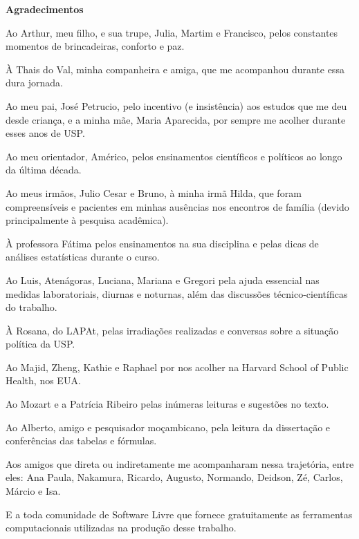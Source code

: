 \newpage

\begin{center}
  \textbf{Agradecimentos} 
\end{center}

Ao Arthur, meu filho, e sua trupe, Julia, Martim e Francisco, pelos 
constantes momentos de brincadeiras, conforto e paz.

À Thais do Val, minha companheira e amiga, que me acompanhou durante  
essa dura jornada.  

Ao meu pai, José Petrucio, pelo incentivo (e insistência) aos estudos que me deu desde criança, e a minha mãe, Maria Aparecida, por sempre me acolher durante esses anos de USP. 

Ao meu orientador, Américo, pelos ensinamentos científicos e políticos ao longo da última década. 

Ao meus irmãos, Julio Cesar e Bruno, à minha irmã Hilda, que foram compreensíveis e pacientes em minhas ausências nos encontros de família (devido principalmente à pesquisa acadêmica).  

À professora Fátima pelos ensinamentos na sua disciplina e pelas dicas de  
análises estatísticas durante o curso. 

Ao Luis, Atenágoras, Luciana, Mariana e Gregori pela ajuda essencial nas medidas laboratoriais, diurnas e noturnas, além das discussões técnico-científicas do trabalho. 

À Rosana, do LAPAt, pelas irradiações realizadas e conversas sobre a situação 
política da USP.  

Ao Majid, Zheng, Kathie e Raphael por nos acolher na Harvard School of Public 
Health, nos EUA.

Ao Mozart e a Patrícia Ribeiro pelas inúmeras leituras e sugestões no texto. 

Ao Alberto, amigo e pesquisador moçambicano, pela leitura da dissertação e conferências das tabelas e fórmulas. 

Aos amigos que direta ou indiretamente me acompanharam nessa trajetória, entre eles: 
Ana Paula, Nakamura, Ricardo, Augusto, Normando, Deidson, Zé, Carlos, Márcio e Isa.

E a toda comunidade de Software Livre que fornece gratuitamente as ferramentas computacionais utilizadas na produção desse trabalho. 